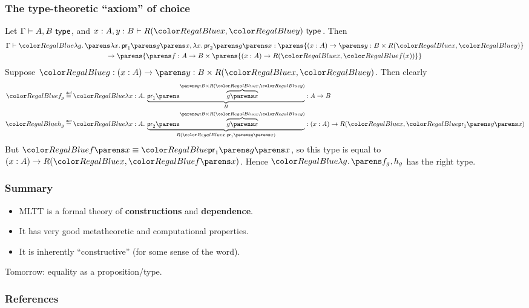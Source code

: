 \documentclass{beamer} %
\begin{document}
\begin{frame}
  \frametitle{The type-theoretic ``axiom'' of choice}
  
  Let $\IsTy{A, B}[]$, and $\IsTy[x : A, y : B]{R(\Tm{x}, \Tm{y})}[]$. Then
  \begin{multline*}
    \IsTm{
      \Lam{g}{
        \Pair{
          \Lam{x}{\Proj[1]{\App{g}{x}}}
        }{
          \Lam{x}{\Proj[2]{\App{g}{x}}}
        }
      }
    }{
      \parens{\Fn{x}{A}{\DSum{y}{B}{R(\Tm{x}, \Tm{y})}}} \\ 
      \to \parens{ \DSum{f}{A \to B}{\parens{\Fn{x}{A}{R(\Tm{x}, \Tm{f(x)})}}} }
    } 
  \end{multline*}
  Suppose $\Tm{g} : \Fn{x}{A}{\DSum{y}{B}{R(\Tm{x}, \Tm{y})}}$. Then clearly
  \begin{align*}
    \Tm{f_g} &\defeq \Tm{
      \Lam{x}[A]{
        \underbrace{\Proj[1]{\overbrace{\App{g}{x}}^{\DSum{y}{B}{R(\Tm{x}, \Tm{y})}}}}_{B}
      }
    } : A \to B 
    \\
    \Tm{h_g} &\defeq \Tm{
      \Lam{x}[A]{
        \underbrace{\Proj[2]{\overbrace{\App{g}{x}}^{\DSum{y}{B}{R(\Tm{x}, \Tm{y})}}}}_{
          R(\Tm{x}, \Proj[1]{\App{g}{x}})
        }
      } 
    } : \Fn{x}{A}{R(\Tm{x}, \Tm{\Proj[1]{\App{g}{x}}})}
  \end{align*}
  But $\Tm{\App{f}{x}} \equiv \Tm{\Proj[1]{\App{g}{x}}}$, so this type is equal
  to $\Fn{x}{A}{R(\Tm{x}, \Tm{\App{f}{x}})}$. Hence $\Tm{\Lam{g}{\Pair{f_g}{h_g}}}$ has the
  right type.
  
\end{frame}

\begin{frame}
  \frametitle{Summary}
  \begin{itemize}
    \item MLTT is a formal theory of \textbf{constructions} and \textbf{dependence}.
    \item It has very good metatheoretic and computational properties.
    \item It is inherently ``constructive'' (for some sense of the word).
  \end{itemize}
  
  \medskip

  Tomorrow: equality as a proposition/type.
  
\end{frame}

\begin{frame}
  \frametitle{References}
  
  
  \nocite{martin-lof_1975}
  \nocite{martin-lof_1984}
  \nocite{nordstrom_1990}
  \nocite{hofmann_1997}
\end{frame}
\end{document}
